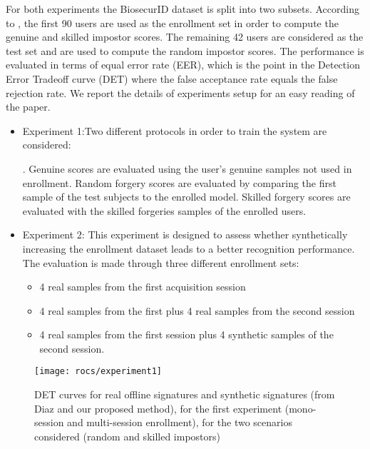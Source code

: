 For both experiments the BiosecurID dataset is split into two subsets. According to \cite{diaz2014generation}, the first 90 users are used as the enrollment set in order to compute the genuine and skilled impostor scores. The remaining 42 users are considered as the test set and are used to compute the random impostor scores. The performance is evaluated in terms of equal error rate (EER), which is the point in the Detection Error Tradeoff curve (DET) where the false acceptance rate equals the false rejection rate. We report the details of experiments setup for an easy reading of the paper.

\begin{itemize}
	\item Experiment 1:Two different protocols in order to train the system are considered:	
	. Genuine scores are evaluated using the user’s genuine samples not used in enrollment. Random forgery scores are evaluated by comparing the first sample of the test subjects to the enrolled model. Skilled forgery scores are evaluated with the skilled forgeries samples of the enrolled users.
	
	\item Experiment 2: This experiment is designed to assess whether synthetically increasing the enrollment dataset leads to a better recognition performance. The evaluation is made through three different enrollment sets:
	\begin{itemize}
		\item 4 real samples from the first acquisition session
		\item 4 real samples from the first plus 4 real samples from the second session
		\item 4 real samples from the first session plus 4 synthetic samples of the second session.
	\end{itemize}
	
\end{itemize}

\begin{figure}[!htb]
	\centering
	\texttt{[image: rocs/experiment1]}
	\caption{DET curves for real offline signatures and synthetic signatures (from Diaz and our proposed method), for the first experiment (mono-session and multi-session enrollment), for the two scenarios considered (random and skilled impostors)}
	\label{exp1}
\end{figure}



